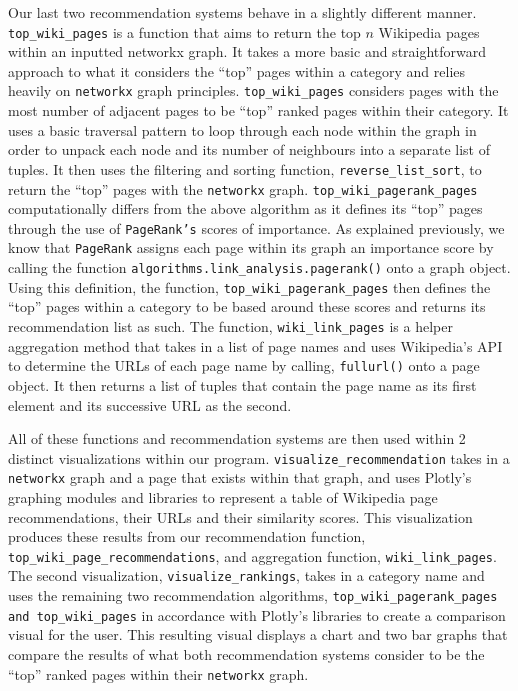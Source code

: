 \documentclass[fontsize=11pt]{article}
\begin{document}
Our last two recommendation systems behave in a slightly different manner. \texttt{top\_wiki\_pages} is a function that aims to return the top \(n\) Wikipedia pages within an inputted networkx graph. It takes a more basic and straightforward approach to what it considers the ``top'' pages within a category and relies heavily on \texttt{networkx} graph principles. \texttt{top\_wiki\_pages} considers pages with the most number of adjacent pages to be ``top'' ranked pages within their category. It uses a basic traversal pattern to loop through each node within the graph in order to unpack each node and its number of neighbours into a separate list of tuples. It then uses the filtering and sorting function, \texttt{reverse\_list\_sort}, to return the ``top'' pages with the \texttt{networkx} graph. \texttt{top\_wiki\_pagerank\_pages} computationally differs from the above algorithm as it defines its ``top'' pages through the use of \texttt{PageRank's} scores of importance. As explained previously, we know that \texttt{PageRank} assigns each page within its graph an importance score by calling the function \texttt{algorithms.link\_analysis.pagerank()} onto a graph object. Using this definition, the function, \texttt{top\_wiki\_pagerank\_pages} then defines the ``top'' pages within a category to be based around these scores and returns its recommendation list as such. The function, \texttt{wiki\_link\_pages} is a helper aggregation method that takes in a list of page names and uses Wikipedia's API to determine the URLs of each page name by calling, \texttt{fullurl()} onto a page object. It then returns a list of tuples that contain the page name as its first element and its successive URL as the second. 

All of these functions and recommendation systems are then used within 2 distinct visualizations within our program. \texttt{visualize\_recommendation} takes in a \texttt{networkx} graph and a page that exists within that graph, and uses Plotly's graphing modules and libraries to represent a table of Wikipedia page recommendations, their URLs and their similarity scores. This visualization produces these results from our recommendation function, \texttt{top\_wiki\_page\_recommendations}, and aggregation function, \texttt{wiki\_link\_pages}. The second visualization, \texttt{visualize\_rankings}, takes in a category name and uses the remaining two recommendation algorithms, \texttt{top\_wiki\_pagerank\_pages and top\_wiki\_pages} in accordance with Plotly's libraries to create a comparison visual for the user. This resulting visual displays a chart and two bar graphs that compare the results of what both recommendation systems consider to be the ``top'' ranked pages within their \texttt{networkx} graph.
\end{document}
